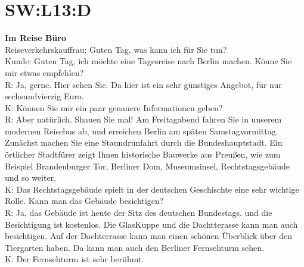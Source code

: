 \section{SW:L13:D}
\textbf{Im Reise Büro} \\
Reiseverkehrskauffrau: Guten Tag, was kann ich für Sie tun? \\
Kunde: Guten Tag, ich möchte eine Tagesreise nach Berlin machen. Könne Sie mir etwas empfehlen?  \\
R: Ja, gerne. Hier sehen Sie. Da hier ist ein sehr günstiges Angebot, für nur sechsundvierzig Euro.  \\
K: Können Sie mir ein paar genauere  Informationen geben? \\
R: Aber natürlich. Shauen Sie mal!
Am Freitagabend fahren Sie in unserem modernen Reisebus ab, und
erreichen Berlin am späten Samstagvormittag.
Zunächst  machen Sie eine Staundrunfahrt durch die Bundeshauptstadt.
Ein örtlicher  Stadtfürer zeigt Ihnen historische Bauwerke aus Preußen, 
wie zum Beispiel Brandenburger Tor, Berliner Dom, Museumsinsel, Rechtstagsgebäude und so weiter. \\
K: Das Rechtstagsgebäude spielt in der deutschen Geschischte eine sehr wichtige Rolle. 
Kann man das Gebäude besichtigen?  \\
R: Ja, das Gebäude ist heute der Sitz des deutschen Bundestags.  und die Besichtigung ist kostenlos. 
Die GlasKuppe und die Dachtterasse kann man auch besichtigen. 
Auf der Dachterrasse kann man einen schönen Überblick  über den Tiergarten haben.
Da kann man auch den Berliner Fernsehturm sehen. \\
K: Der Fernsehturm ist sehr berühmt. 
